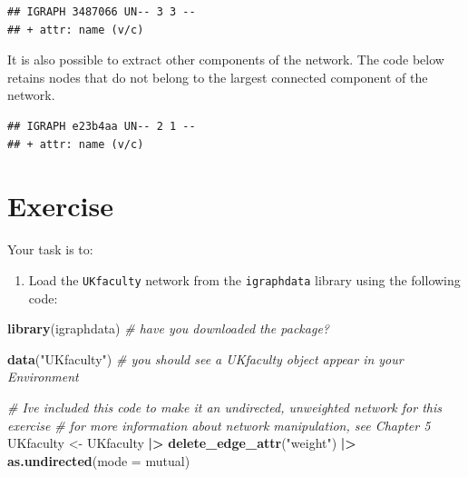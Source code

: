 \documentclass[
]{book}
\newenvironment{Shaded}{\begin{snugshade}}{\end{snugshade}}
\newcommand{\AttributeTok}[1]{\textcolor[rgb]{0.13,0.29,0.53}{#1}}
\newcommand{\CommentTok}[1]{\textcolor[rgb]{0.56,0.35,0.01}{\textit{#1}}}
\newcommand{\FunctionTok}[1]{\textcolor[rgb]{0.13,0.29,0.53}{\textbf{#1}}}
\newcommand{\NormalTok}[1]{#1}
\newcommand{\OtherTok}[1]{\textcolor[rgb]{0.56,0.35,0.01}{#1}}
\newcommand{\SpecialCharTok}[1]{\textcolor[rgb]{0.81,0.36,0.00}{\textbf{#1}}}
\newcommand{\StringTok}[1]{\textcolor[rgb]{0.31,0.60,0.02}{#1}}
\providecommand{\tightlist}{%
  \setlength{\itemsep}{0pt}\setlength{\parskip}{0pt}}
\begin{document}
\begin{verbatim}
## IGRAPH 3487066 UN-- 3 3 -- 
## + attr: name (v/c)
\end{verbatim}

It is also possible to extract other components of the network. The code below retains nodes that do not belong to the largest connected component of the network.

\begin{Shaded}
\end{Shaded}

\begin{verbatim}
## IGRAPH e23b4aa UN-- 2 1 -- 
## + attr: name (v/c)
\end{verbatim}

\section{Exercise}\label{exercise-4}

Your task is to:

\begin{enumerate}
\def\labelenumi{\arabic{enumi}.}
\tightlist
\item
  Load the \texttt{UKfaculty} network from the \texttt{igraphdata} library using the following code:
\end{enumerate}

\begin{Shaded}
\begin{Highlighting}[]
\FunctionTok{library}\NormalTok{(igraphdata) }\CommentTok{\# have you downloaded the package? }

\FunctionTok{data}\NormalTok{(}\StringTok{"UKfaculty"}\NormalTok{) }\CommentTok{\# you should see a UKfaculty object appear in your Environment}

\CommentTok{\# I\textquotesingle{}ve included this code to make it an undirected, unweighted network for this exercise}
\CommentTok{\# for more information about network manipulation, see Chapter 5}
\NormalTok{UKfaculty }\OtherTok{\textless{}{-}}\NormalTok{ UKfaculty }\SpecialCharTok{|\textgreater{}} \FunctionTok{delete\_edge\_attr}\NormalTok{(}\StringTok{"weight"}\NormalTok{) }\SpecialCharTok{|\textgreater{}} \FunctionTok{as.undirected}\NormalTok{(}\AttributeTok{mode =} \StringTok{\textquotesingle{}mutual\textquotesingle{}}\NormalTok{)}
\end{Highlighting}
\end{Shaded}
\end{document}
